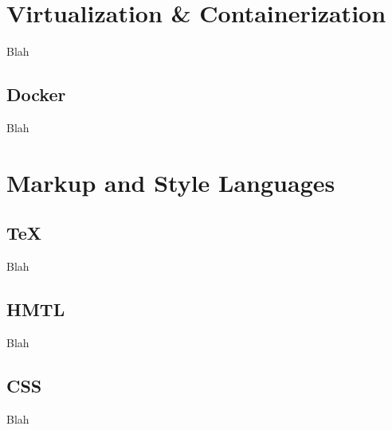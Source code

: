 
\toclineskip
\section{Virtualization \& Containerization}

Blah


\subsection{Docker}

Blah


\toclineskip
\section{Markup and Style Languages}


\subsection{TeX}

Blah


\subsection{HMTL}

Blah


\subsection{CSS}

Blah


